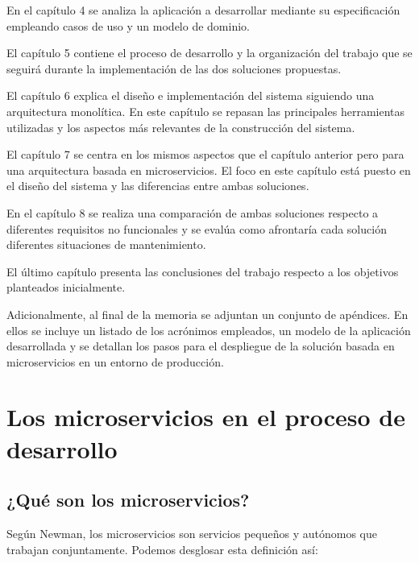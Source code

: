 \documentclass[11pt,spanish,listoffigures]{tfgetsinf}
\begin{document}
En el capítulo 4 se analiza la aplicación a desarrollar mediante su especificación   empleando casos de uso y un modelo de dominio.

El capítulo 5 contiene el proceso de desarrollo y la organización del trabajo que se seguirá durante la implementación de las dos soluciones propuestas.

El capítulo 6 explica el diseño e implementación del sistema siguiendo una arquitectura monolítica. En este capítulo se repasan las principales herramientas utilizadas y los aspectos más relevantes de la construcción del sistema.

El capítulo 7 se centra en los mismos aspectos que el capítulo anterior pero para una arquitectura basada en microservicios. El foco en este capítulo está puesto en el diseño del sistema y las diferencias entre ambas soluciones.

En el capítulo 8 se realiza una comparación de ambas soluciones respecto a diferentes requisitos no funcionales  y se evalúa como afrontaría cada solución diferentes situaciones de mantenimiento.

El último capítulo presenta las conclusiones del trabajo respecto a los objetivos planteados inicialmente.

Adicionalmente, al final de la memoria se adjuntan un conjunto de apéndices. En ellos  se incluye un listado de los acrónimos empleados, un modelo de la aplicación desarrollada y se detallan los pasos para el despliegue de la solución basada en microservicios en un entorno de producción.

%

\chapter{Los microservicios en el proceso de desarrollo}

\section{¿Qué son los microservicios?}

Según Newman, \cite{Newman2015a} los microservicios son servicios pequeños y autónomos que trabajan conjuntamente. Podemos desglosar esta definición así:
\end{document}
